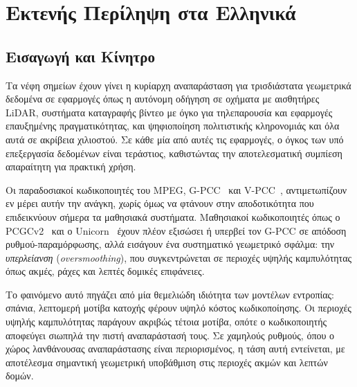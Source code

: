 \chapter*{%
  Εκτενής Περίληψη στα Ελληνικά%
}

\renewcommand{\thesection}{\arabic{section}}
\section{Εισαγωγή και Κίνητρο}
Τα νέφη σημείων έχουν γίνει η κυρίαρχη αναπαράσταση για τρισδιάστατα γεωμετρικά δεδομένα σε εφαρμογές όπως η αυτόνομη οδήγηση σε οχήματα με αισθητήρες LiDAR,
συστήματα καταγραφής βίντεο με όγκο για τηλεπαρουσία και εφαρμογές επαυξημένης πραγματικότητας, και ψηφιοποίηση πολιτιστικής κληρονομιάς και όλα αυτά σε ακρίβεια χιλιοστού.
Σε κάθε μία από αυτές τις εφαρμογές, ο όγκος των υπό επεξεργασία δεδομένων είναι τεράστιος, καθιστώντας την αποτελεσματική συμπίεση απαραίτητη για πρακτική χρήση.

Οι παραδοσιακοί κωδικοποιητές του MPEG, G-PCC~\cite{graziosi2020gpcc} και V-PCC~\cite{schwarz2018emerging}, αντιμετωπίζουν εν μέρει αυτήν την ανάγκη, χωρίς όμως να φτάνουν στην αποδοτικότητα που επιδεικνύουν σήμερα τα μαθησιακά συστήματα.
Μαθησιακοί κωδικοποιητές όπως ο PCGCv2~\cite{wang2021multiscale} και ο Unicorn~\cite{wang2025unicorn} έχουν πλέον εξισώσει ή υπερβεί τον G-PCC σε απόδοση ρυθμού-παραμόρφωσης, αλλά εισάγουν ένα συστηματικό γεωμετρικό σφάλμα:
την \textit{υπερλείανση} (\textit{oversmoothing}), που συγκεντρώνεται σε περιοχές υψηλής καμπυλότητας όπως ακμές, ράχες και λεπτές δομικές επιφάνειες.

Το φαινόμενο αυτό πηγάζει από μία θεμελιώδη ιδιότητα των μοντέλων εντροπίας: σπάνια, λεπτομερή μοτίβα κατοχής φέρουν υψηλό κόστος κωδικοποίησης.
Οι περιοχές υψηλής καμπυλότητας παράγουν ακριβώς τέτοια μοτίβα, οπότε ο κωδικοποιητής αποφεύγει σιωπηλά την πιστή αναπαράστασή τους.
Σε χαμηλούς ρυθμούς, όπου ο χώρος λανθάνουσας αναπαράστασης είναι περιορισμένος, η τάση αυτή εντείνεται, με αποτέλεσμα σημαντική γεωμετρική υποβάθμιση στις περιοχές ακμών και λεπτών δομών.

